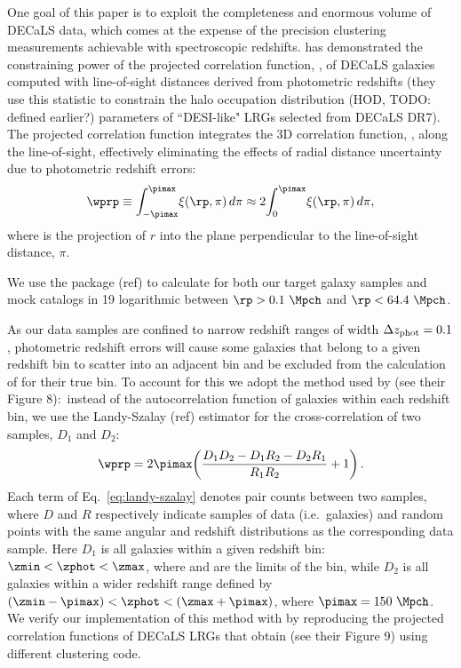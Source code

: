 \documentclass[twocolumn,apj,iop,tighten]{emulateapj2}
\begin{document}
One goal of this paper is to exploit the completeness and enormous volume of DECaLS data, which comes at the expense of the precision clustering measurements achievable with spectroscopic redshifts. \citet{zhou_etal20b} has demonstrated the constraining power of the projected correlation function, \wprp, of DECaLS galaxies computed with line-of-sight distances derived from photometric redshifts (they use this statistic to constrain the halo occupation distribution (HOD, TODO: defined earlier?) parameters of ``DESI-like" LRGs selected from DECaLS DR7). The projected correlation function integrates the 3D correlation function, \xir, along the line-of-sight, effectively eliminating the effects of radial distance uncertainty due to photometric redshift errors:
%
\begin{equation}
\wprp \equiv \int_{-\pimax}^{\pimax}\!\xi(\rp,\pi)\,d\pi \approx 2\!\int_0^{\pimax}\!\xi(\rp,\pi)\,d\pi,
\end{equation}
%
\noindent where \rp is the projection of $r$ into the plane perpendicular to the line-of-sight distance, $\pi$.

We use the \corrfunc package (ref) to calculate \wprp for both our target galaxy samples and mock catalogs in 19 logarithmic between ${\rp>0.1\ \Mpch}$ and ${\rp<64.4\ \Mpch}$.

As our data samples are confined to narrow redshift ranges of width ${\Delta z_{\rm phot} = 0.1}$, photometric redshift errors will cause some galaxies that belong to a given redshift bin to scatter into an adjacent bin and be excluded from the calculation of \wprp for their true bin. To account for this we adopt the method used by \citet{zhou_etal20b} (see their Figure 8):\ instead of the autocorrelation function of galaxies within each redshift bin, we use the Landy-Szalay (ref) estimator for the cross-correlation of two samples, $D_1$ and $D_2$:
%
\begin{equation}\label{eq:landy-szalay}
\wprp = 2\pimax\!\left(\frac{D_1D_2 - D_1R_2 - D_2R_1}{R_1R_2} + 1 \right).
\end{equation}
%
\noindent Each term of Eq.~\ref{eq:landy-szalay} denotes pair counts between two samples, where $D$ and $R$ respectively indicate samples of data (i.e.\ galaxies) and random points with the same angular and redshift distributions as the corresponding data sample. Here $D_1$ is all galaxies within a given redshift bin: ${\zmin < \zphot < \zmax}$, where \zmin and \zmax are the limits of the bin, while $D_2$ is all galaxies within a wider redshift range defined by ${(\zmin-\pimax) < \zphot < (\zmax+\pimax)}$, where ${\pimax=150~\Mpch}$.
We verify our implementation of this method with \corrfunc by reproducing the projected correlation functions of DECaLS LRGs that \citet{zhou_etal20b} obtain (see their Figure 9) using different clustering code.
\end{document}
